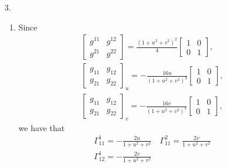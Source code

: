 \documentclass[a4paper,12pt]{article}
\theoremstyle{remark}
\begin{document}
\begin{enumerate}
    \item[3.]
        \begin{enumerate}
            \item
                Since
                \begin{gather*}
                    \left[ \begin{array}{cc}
                            g^{11} & g^{12} \\
                            g^{21} & g^{22}
                    \end{array} \right]
                    = \frac{(1 + u^2 + v^2)^2}{4}
                    \left[ \begin{array}{cc}
                            1 & 0 \\
                            0 & 1
                    \end{array} \right], \\
                    \left[ \begin{array}{cc}
                            g_{11} & g_{12} \\
                            g_{21} & g_{22}
                    \end{array} \right]_u
                    = -\frac{16u}{(1 + u^2 + v^2)^3}
                    \left[ \begin{array}{cc}
                            1 & 0 \\
                            0 & 1
                    \end{array} \right], \\
                    \left[ \begin{array}{cc}
                            g_{11} & g_{12} \\
                            g_{21} & g_{22}
                    \end{array} \right]_v
                    = -\frac{16v}{(1 + u^2 + v^2)^3}
                    \left[ \begin{array}{cc}
                            1 & 0 \\
                            0 & 1
                    \end{array} \right],
                \end{gather*}
                we have that
                \begin{gather*}
                    \Gamma_{11}^1 = -\frac{2u}{1 + u^2 + v^2} \quad
                    \Gamma_{11}^2 = \frac{2v}{1 + u^2 + v^2} \\
                    \Gamma_{12}^1 = -\frac{2v}{1 + u^2 + v^2} \quad

\end{gather*}
\end{enumerate}
\end{enumerate}
\end{document}
